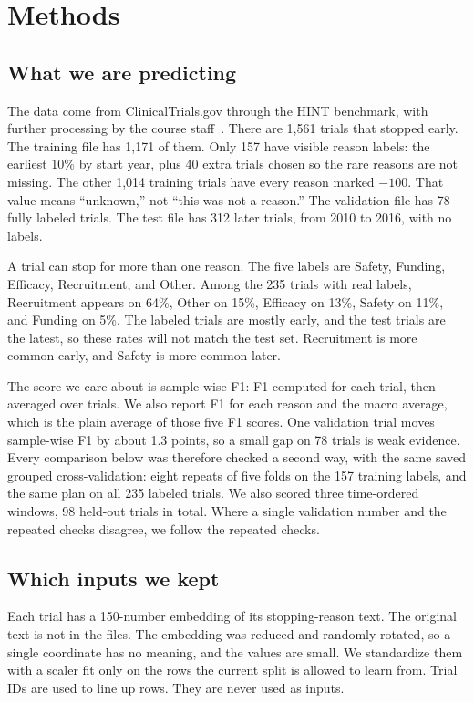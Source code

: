 \section{Methods}
\label{sec:methods}

\subsection{What we are predicting}

The data come from ClinicalTrials.gov through the HINT benchmark, with further
processing by the course staff~\cite{fu2022hint,clinicaltrials}. There are 1,561
trials that stopped early. The training file has 1,171 of them. Only 157 have
visible reason labels: the earliest 10\% by start year, plus 40 extra trials
chosen so the rare reasons are not missing. The other 1,014 training trials have
every reason marked $-100$. That value means ``unknown,'' not ``this was not a
reason.'' The validation file has 78 fully labeled trials. The test file has 312
later trials, from 2010 to 2016, with no labels.

A trial can stop for more than one reason. The five labels are Safety, Funding,
Efficacy, Recruitment, and Other. Among the 235 trials with real labels,
Recruitment appears on 64\%, Other on 15\%, Efficacy on 13\%, Safety on 11\%, and
Funding on 5\%. The labeled trials are mostly early, and the test trials are the
latest, so these rates will not match the test set. Recruitment is more common
early, and Safety is more common later.

The score we care about is sample-wise F1: F1 computed for each trial, then
averaged over trials. We also report F1 for each reason and the macro average,
which is the plain average of those five F1 scores. One validation trial moves
sample-wise F1 by about 1.3 points, so a small gap on 78 trials is weak evidence.
Every comparison below was therefore checked a second way, with the same saved
grouped cross-validation: eight repeats of five folds on the 157 training labels,
and the same plan on all 235 labeled trials. We also scored three time-ordered
windows, 98 held-out trials in total. Where a single validation number and the
repeated checks disagree, we follow the repeated checks.

\subsection{Which inputs we kept}

Each trial has a 150-number embedding of its stopping-reason text. The original
text is not in the files. The embedding was reduced and randomly rotated, so a
single coordinate has no meaning, and the values are small. We standardize them
with a scaler fit only on the rows the current split is allowed to learn from.
Trial IDs are used to line up rows. They are never used as inputs.

